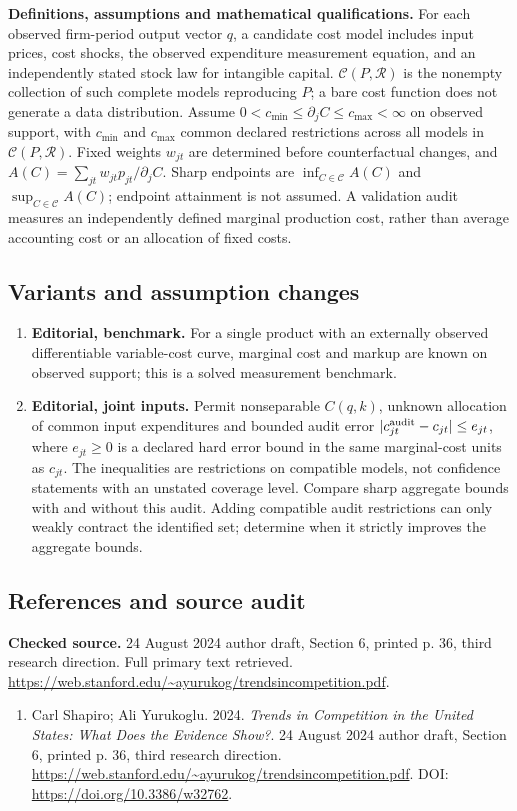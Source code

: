 \documentclass[11pt,a4paper]{article}
\begin{document}
\textbf{Definitions, assumptions and mathematical qualifications.} For each observed firm-period output vector \(q\), a candidate cost model includes input prices, cost shocks, the observed expenditure measurement equation, and an independently stated stock law for intangible capital. \(\mathcal C(P,\mathcal R)\) is the nonempty collection of such complete models reproducing \(P\); a bare cost function does not generate a data distribution. Assume \(0<c_{\min}\leq\partial_j C\leq c_{\max}<\infty\) on observed support, with \(c_{\min}\) and \(c_{\max}\) common declared restrictions across all models in \(\mathcal C(P,\mathcal R)\). Fixed weights \(w_{jt}\) are determined before counterfactual changes, and \(A(C)=\sum_{jt}w_{jt}p_{jt}/\partial_jC\). Sharp endpoints are \(\inf_{C\in\mathcal C}A(C)\) and \(\sup_{C\in\mathcal C}A(C)\); endpoint attainment is not assumed. A validation audit measures an independently defined marginal production cost, rather than average accounting cost or an allocation of fixed costs.
\subsection*{Variants and assumption changes}
\begin{enumerate}
\item \textbf{Editorial, benchmark.} For a single product with an externally observed differentiable variable-cost curve, marginal cost and markup are known on observed support; this is a solved measurement benchmark.
\item \textbf{Editorial, joint inputs.} Permit nonseparable \(C(q,k)\), unknown allocation of common input expenditures and bounded audit error \(|c^{\rm audit}_{jt}-c_{jt}|\leq e_{jt}\), where \(e_{jt}\geq0\) is a declared hard error bound in the same marginal-cost units as \(c_{jt}\). The inequalities are restrictions on compatible models, not confidence statements with an unstated coverage level. Compare sharp aggregate bounds with and without this audit. Adding compatible audit restrictions can only weakly contract the identified set; determine when it strictly improves the aggregate bounds.
\end{enumerate}
\subsection*{References and source audit}
\textbf{Checked source.} 24 August 2024 author draft, Section 6, printed p. 36, third research direction. Full primary text retrieved. \url{https://web.stanford.edu/~ayurukog/trendsincompetition.pdf}.
\begin{enumerate}\raggedright
\item\hypertarget{definitions:source:30007673:1}{} Carl Shapiro; Ali Yurukoglu. 2024. \emph{Trends in Competition in the United States: What Does the Evidence Show?}. 24 August 2024 author draft, Section 6, printed p. 36, third research direction.
\url{https://web.stanford.edu/~ayurukog/trendsincompetition.pdf}.
DOI: \url{https://doi.org/10.3386/w32762}.
\end{enumerate}
\end{document}
